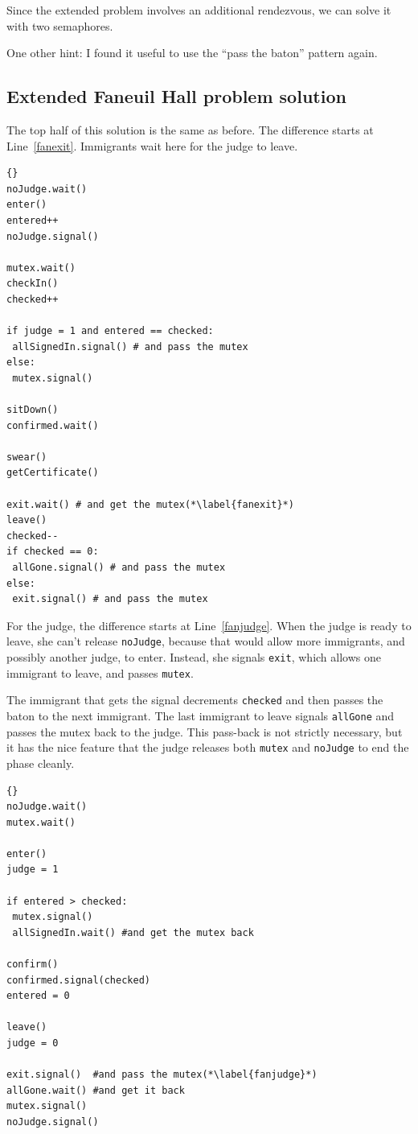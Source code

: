 \documentclass{book}
\begin{document}
Since the extended problem involves an additional rendezvous,
we can solve it with two semaphores.

One other hint: I found it useful to use the ``pass the baton''
pattern again.



\subsection {Extended Faneuil Hall problem solution}

The top half of this solution is the same as before.  The
difference starts at Line~\ref{fanexit}.  Immigrants wait
here for the judge to leave.

\newpage
\begin{lstlisting}[title={Faneuil Hall problem solution (immigrant)}]{}
noJudge.wait()
enter()
entered++
noJudge.signal()

mutex.wait()
checkIn()
checked++

if judge = 1 and entered == checked:
 allSignedIn.signal() # and pass the mutex
else:
 mutex.signal()

sitDown()
confirmed.wait()

swear()
getCertificate()

exit.wait() # and get the mutex(*\label{fanexit}*)
leave()
checked--
if checked == 0:
 allGone.signal() # and pass the mutex
else:
 exit.signal() # and pass the mutex
\end{lstlisting}

For the judge, the difference starts at Line~\ref{fanjudge}.
When the judge is ready to leave, she can't release {\tt noJudge},
because that would allow more immigrants, and possibly another
judge, to enter.  Instead, she signals {\tt exit}, which allows
one immigrant to leave, and passes {\tt mutex}.

The immigrant that gets the signal decrements {\tt checked} and
then passes the baton to the next immigrant.  The last immigrant
to leave signals {\tt allGone} and passes the mutex back to the
judge.  This pass-back is not strictly necessary, but it has
the nice feature that the judge releases both {\tt mutex}
and {\tt noJudge} to end the phase cleanly.

\newpage
\begin{lstlisting}[title={Faneuil Hall problem solution (judge)}]{}
noJudge.wait()
mutex.wait()

enter()
judge = 1

if entered > checked:
 mutex.signal()
 allSignedIn.wait() #and get the mutex back

confirm()
confirmed.signal(checked)
entered = 0

leave()
judge = 0

exit.signal()  #and pass the mutex(*\label{fanjudge}*)
allGone.wait() #and get it back
mutex.signal()
noJudge.signal()
\end{lstlisting}
\end{document}
